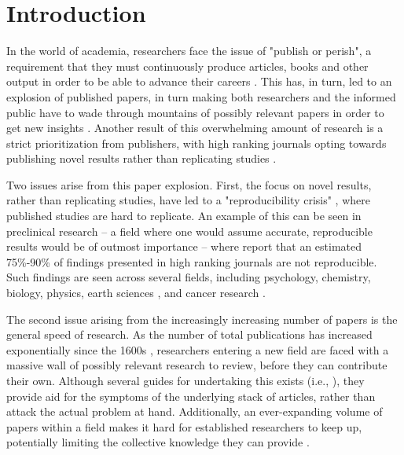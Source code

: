 \section{Introduction}
\label{sec:introduction}
In the world of academia, researchers face the issue of "publish or perish", a requirement that they must continuously produce articles, books and other output in order to be able to advance their careers \parencite{Grimes_2018}. This has, in turn, led to an explosion of published papers, in turn making both researchers and the informed public have to wade through mountains of possibly relevant papers in order to get new insights \parencite{Bornmann_2015}. Another result of this overwhelming amount of research is a strict prioritization from publishers, with high ranking journals opting towards publishing novel results rather than replicating studies \parencite{Grimes_2018}.

Two issues arise from this paper explosion. First, the focus on novel results, rather than replicating studies, have led to a "reproducibility crisis" \parencite{Begley_2015}, where published studies are hard to replicate. An example of this can be seen in preclinical research -- a field where one would assume accurate, reproducible results would be of outmost importance -- where \textcite[p.1]{Begley_2015} report that an estimated 75\%-90\% of findings presented in high ranking journals are not reproducible. Such findings are seen across several fields, including psychology, chemistry, biology, physics, earth sciences \parencite{Baker_2016}, and cancer research \parencite{fMRI_no_author}. %

The second issue arising from the increasingly increasing number of papers is the general speed of research. As the number of total publications has increased exponentially since the 1600s \parencite{Bornmann_2015}, researchers entering a new field are faced with a massive wall of possibly relevant research to review, before they can contribute their own. Although several guides for undertaking this exists (i.e., \cite{Okoli_2015,Popenoe_2021,Nightingale_2009}), they provide aid for the symptoms of the underlying stack of articles, rather than attack the actual problem at hand. Additionally, an ever-expanding volume of papers within a field makes it hard for established researchers to keep up, potentially limiting the collective knowledge they can provide \parencite{Davies_2017}.

